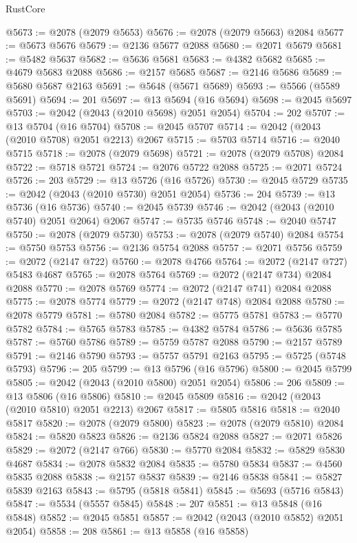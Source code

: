 \begin{lexlean}{RustCore}
\begin{coremodule}
@5673 := @2078 (@2079 @5653)
@5676 := @2078 (@2079 @5663) @2084
@5677 := @5673 @5676
@5679 := @2136 @5677 @2088
@5680 := @2071 @5679
@5681 := @5482 @5637
@5682 := @5636 @5681
@5683 := @4382 @5682
@5685 := @4679 @5683 @2088
@5686 := @2157 @5685
@5687 := @2146 @5686
@5689 := @5680 @5687 @2163
@5691 := @5648 (@5671 @5689)
@5693 := @5566 (@5589 @5691)
@5694 := 201
@5697 := @13 @5694 (@16 @5694)
@5698 := @2045 @5697
@5703 := @2042 (@2043 (@2010 @5698) @2051 @2054)
@5704 := 202
@5707 := @13 @5704 (@16 @5704)
@5708 := @2045 @5707
@5714 := @2042 (@2043 (@2010 @5708) @2051 @2213) @2067
@5715 := @5703 @5714
@5716 := @2040 @5715
@5718 := @2078 (@2079 @5698)
@5721 := @2078 (@2079 @5708) @2084
@5722 := @5718 @5721
@5724 := @2076 @5722 @2088
@5725 := @2071 @5724
@5726 := 203
@5729 := @13 @5726 (@16 @5726)
@5730 := @2045 @5729
@5735 := @2042 (@2043 (@2010 @5730) @2051 @2054)
@5736 := 204
@5739 := @13 @5736 (@16 @5736)
@5740 := @2045 @5739
@5746 := @2042 (@2043 (@2010 @5740) @2051 @2064) @2067
@5747 := @5735 @5746
@5748 := @2040 @5747
@5750 := @2078 (@2079 @5730)
@5753 := @2078 (@2079 @5740) @2084
@5754 := @5750 @5753
@5756 := @2136 @5754 @2088
@5757 := @2071 @5756
@5759 := @2072 (@2147 @722)
@5760 := @2078 @4766
@5764 := @2072 (@2147 @727) @5483 @4687
@5765 := @2078 @5764
@5769 := @2072 (@2147 @734) @2084 @2088
@5770 := @2078 @5769
@5774 := @2072 (@2147 @741) @2084 @2088
@5775 := @2078 @5774
@5779 := @2072 (@2147 @748) @2084 @2088
@5780 := @2078 @5779
@5781 := @5780 @2084
@5782 := @5775 @5781
@5783 := @5770 @5782
@5784 := @5765 @5783
@5785 := @4382 @5784
@5786 := @5636 @5785
@5787 := @5760 @5786
@5789 := @5759 @5787 @2088
@5790 := @2157 @5789
@5791 := @2146 @5790
@5793 := @5757 @5791 @2163
@5795 := @5725 (@5748 @5793)
@5796 := 205
@5799 := @13 @5796 (@16 @5796)
@5800 := @2045 @5799
@5805 := @2042 (@2043 (@2010 @5800) @2051 @2054)
@5806 := 206
@5809 := @13 @5806 (@16 @5806)
@5810 := @2045 @5809
@5816 := @2042 (@2043 (@2010 @5810) @2051 @2213) @2067
@5817 := @5805 @5816
@5818 := @2040 @5817
@5820 := @2078 (@2079 @5800)
@5823 := @2078 (@2079 @5810) @2084
@5824 := @5820 @5823
@5826 := @2136 @5824 @2088
@5827 := @2071 @5826
@5829 := @2072 (@2147 @766)
@5830 := @5770 @2084
@5832 := @5829 @5830 @4687
@5834 := @2078 @5832 @2084
@5835 := @5780 @5834
@5837 := @4560 @5835 @2088
@5838 := @2157 @5837
@5839 := @2146 @5838
@5841 := @5827 @5839 @2163
@5843 := @5795 (@5818 @5841)
@5845 := @5693 (@5716 @5843)
@5847 := @5534 (@5557 @5845)
@5848 := 207
@5851 := @13 @5848 (@16 @5848)
@5852 := @2045 @5851
@5857 := @2042 (@2043 (@2010 @5852) @2051 @2054)
@5858 := 208
@5861 := @13 @5858 (@16 @5858)

\end{coremodule}
\end{lexlean}

